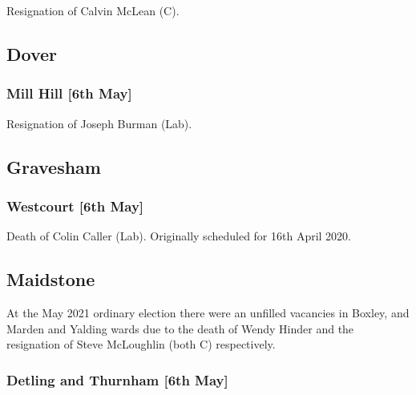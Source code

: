 \documentclass[a4paper,openany]{book}
\begin{document}
\begin{resultsiii}

Resignation of Calvin McLean (C).

\subsection*{Dover}

\subsubsection*{Mill Hill \hspace*{\fill}\nolinebreak[1]%
	\enspace\hspace*{\fill}
	[6th May]}


Resignation of Joseph Burman (Lab).

\subsection*{Gravesham}

\subsubsection*{Westcourt \hspace*{\fill}\nolinebreak[1]%
	\enspace\hspace*{\fill}
	[6th May]}


Death of Colin Caller (Lab).  Originally scheduled for 16th April 2020.

\subsection*{Maidstone}

At the May 2021 ordinary election there were an unfilled vacancies in Boxley, and Marden and Yalding wards due to the death of Wendy Hinder and the resignation of Steve McLoughlin (both C) respectively.

\subsubsection*{Detling and Thurnham \hspace*{\fill}\nolinebreak[1]%
	\enspace\hspace*{\fill}
	[6th May]}


\end{resultsiii}
\end{document}
